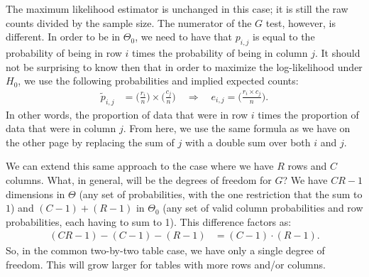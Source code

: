 \documentclass{tufte-handout}
\begin{document}
The maximum likelihood estimator is unchanged in this case; it is still
the raw counts divided by the sample size. The numerator of the $G$ test,
however, is different. In order to be in $\Theta_0$, we need to have that
$p_{i,j}$ is equal to the probability of being in row $i$ times the probability
of being in column $j$. It should not be surprising to know then that in
order to maximize the log-likelihood under $H_0$, we use the following
probabilities and implied expected counts:
\begin{align*}
\tilde{p}_{i,j} &= \biggl(\frac{r_i}{n}\biggl) \times \biggl(\frac{c_j}{n}\biggl)
\quad \Rightarrow \quad 
e_{i,j} = \biggl(\frac{r_i \times c_j}{n}\biggl).
\end{align*}
In other words, the proportion of data that were in row $i$ times the
proportion of data that were in column $j$. From here, we use the same
formula as we have on the other page by replacing the sum of $j$ with a
double sum over both $i$ and $j$.

We can extend this same approach to the case where we have $R$ rows and
$C$ columns. What, in general, will be the degrees of freedom for $G$?
We have $CR-1$ dimensions in $\Theta$ (any set of probabilities, with 
the one restriction that the sum to $1$) and $(C-1) + (R-1)$ in $\Theta_0$
(any set of valid column probabilities and row probabilities, each having
to sum to 1). This difference factors as:
\begin{align*}
(CR-1) - (C-1) - (R-1) &= (C-1) \cdot (R-1).
\end{align*} 
So, in the common two-by-two table case, we have only a single degree of
freedom. This will grow larger for tables with more rows and/or columns.
\end{document}
